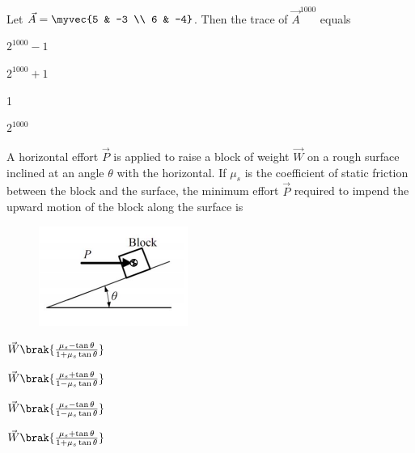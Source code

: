     \item Let $\vec{A} = \myvec{5 & -3 \\ 6 & -4}$. Then the trace of $\vec{A}^{1000}$ equals
    \hfill{}
    \begin{enumerate}
        \begin{multicols}{4}
            \item $2^{1000} - 1$
            \item $2^{1000} + 1$
            \item 1
            \item $2^{1000}$
        \end{multicols}
    \end{enumerate}
    \item A horizontal effort $\vec{P}$ is applied to raise a block of weight $\vec{W}$ on a rough surface inclined at an angle $\theta$ with the horizontal. If $\mu_s$ is the coefficient of static friction between the block and the surface, the minimum effort $\vec{P}$ required to impend the upward motion of the block along the surface is
    \hfill{}
    \begin{figure}[H] \centering \includegraphics[width=0.4\columnwidth]{GATE/2018/XE/figs/q11_solid.png} \caption{} \label{fig:q11_solid} \end{figure}
    \begin{enumerate}
        \begin{multicols}{4}
            \item $\vec{W} \brak{\frac{\mu_s - \tan\theta}{1+\mu_s\tan\theta}}$
            \item $\vec{W} \brak{\frac{\mu_s + \tan\theta}{1-\mu_s\tan\theta}}$
            \item $\vec{W} \brak{\frac{\mu_s - \tan\theta}{1-\mu_s\tan\theta}}$
            \item $\vec{W} \brak{\frac{\mu_s + \tan\theta}{1+\mu_s\tan\theta}}$
        \end{multicols}
    \end{enumerate}

